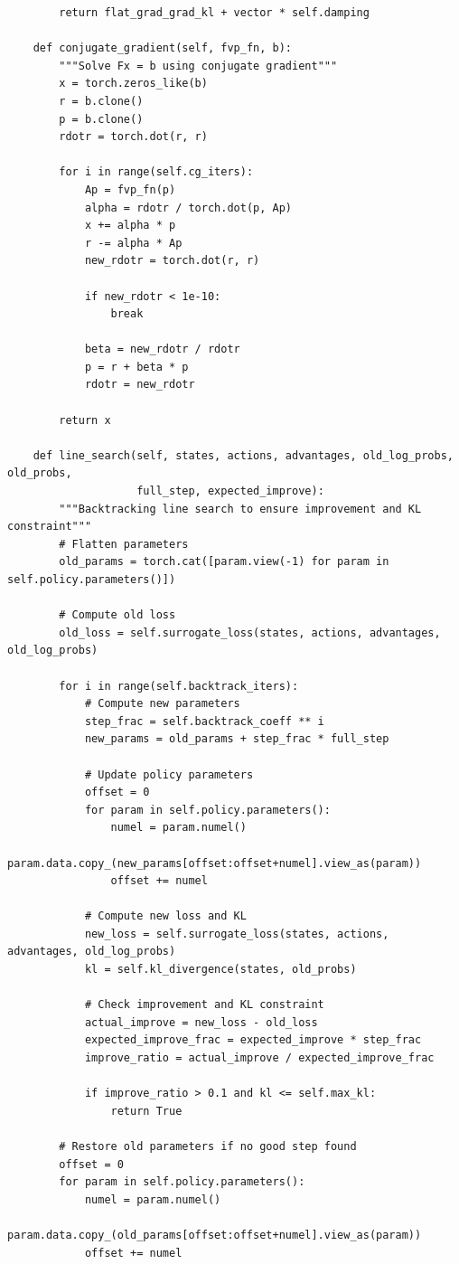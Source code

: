 \documentclass[12pt]{article}
\begin{document}
{{\begin{verbatim}
        return flat_grad_grad_kl + vector * self.damping

    def conjugate_gradient(self, fvp_fn, b):
        """Solve Fx = b using conjugate gradient"""
        x = torch.zeros_like(b)
        r = b.clone()
        p = b.clone()
        rdotr = torch.dot(r, r)

        for i in range(self.cg_iters):
            Ap = fvp_fn(p)
            alpha = rdotr / torch.dot(p, Ap)
            x += alpha * p
            r -= alpha * Ap
            new_rdotr = torch.dot(r, r)

            if new_rdotr < 1e-10:
                break

            beta = new_rdotr / rdotr
            p = r + beta * p
            rdotr = new_rdotr

        return x

    def line_search(self, states, actions, advantages, old_log_probs, old_probs,
                    full_step, expected_improve):
        """Backtracking line search to ensure improvement and KL constraint"""
        # Flatten parameters
        old_params = torch.cat([param.view(-1) for param in self.policy.parameters()])

        # Compute old loss
        old_loss = self.surrogate_loss(states, actions, advantages, old_log_probs)

        for i in range(self.backtrack_iters):
            # Compute new parameters
            step_frac = self.backtrack_coeff ** i
            new_params = old_params + step_frac * full_step

            # Update policy parameters
            offset = 0
            for param in self.policy.parameters():
                numel = param.numel()
                param.data.copy_(new_params[offset:offset+numel].view_as(param))
                offset += numel

            # Compute new loss and KL
            new_loss = self.surrogate_loss(states, actions, advantages, old_log_probs)
            kl = self.kl_divergence(states, old_probs)

            # Check improvement and KL constraint
            actual_improve = new_loss - old_loss
            expected_improve_frac = expected_improve * step_frac
            improve_ratio = actual_improve / expected_improve_frac

            if improve_ratio > 0.1 and kl <= self.max_kl:
                return True

        # Restore old parameters if no good step found
        offset = 0
        for param in self.policy.parameters():
            numel = param.numel()
            param.data.copy_(old_params[offset:offset+numel].view_as(param))
            offset += numel


\end{verbatim}}}
\end{document}
